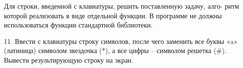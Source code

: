 Для строки, введенной с клавиатуры, решить поставленную задачу, алго-
ритм которой реализовать в виде отдельной функции. В программе не должны
использоваться функции стандартной библиотеки.

11. Ввести с клавиатуры строку символов, после чего заменить все буквы
«a» (латиница) символом звездочка (*), а все цифры – символом решетка (\#).
Вывести результирующую строку на экран.
